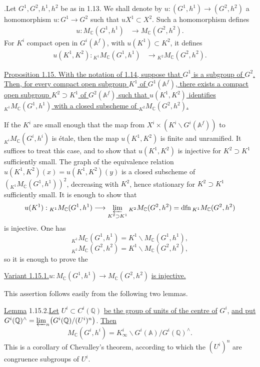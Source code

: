 \documentclass[10pt]{article}
\newcommand{\A}{\mathbb A}
\newcommand{\Af}{\mathbb A^f}
\newcommand{\C}{\mathbb C}
\newcommand{\Q}{\mathbb Q}
\newcommand{\dfn}{\operatorname{dfn}}
\newcommand{\limproj}{\varprojlim}
\newcommand{\MC}{M_{\C}}
\begin{document}
.\quad Let $G^1,G^2,h^1,h^2$ be as in 1.13. We shall denote by $u:(G^1,h^1)\to(G^2,h^2)$ a homomorphism $u:G^1\to G^2$ such that $uX^1\subset X^2$. Such a homomorphism defines
\begingroup
\makeatletter
\tagsleft@true
\makeatother
\begin{align}
u:\MC(G^1,h^1)&\longrightarrow\MC(G^2,h^2). \tag{1.14.1}
\end{align}
\endgroup
For $K^i$ compact open in $G^i(\Af)$, with $u(K^1)\subset K^2$, it defines
\begingroup
\makeatletter
\tagsleft@true
\makeatother
\begin{align}
u(K^1,K^2):{}_{K^1}\MC(G^1,h^1)&\longrightarrow{}_{K^2}\MC(G^2,h^2). \tag{1.14.2}
\end{align}
\endgroup

\noindent\uline{Proposition 1.15. With the notation of 1.14, suppose that $G^1$ is a subgroup of $G^2$. Then, for every compact open subgroup $K^1$ of $G^1(\Af)$, there exists a compact open subgroup $K^2\supset K^1$ of $G^2(\Af)$ such that $u(K^1,K^2)$ identifies ${}_{K^1}\MC(G^1,h^1)$ with a closed subscheme of ${}_{K^2}\MC(G^2,h^2)$.}

If the $K^i$ are small enough that the map from $X^i\times(K^i\backslash G^i(\Af))$ to ${}_{K^i}\MC(G^i,h^i)$ is étale, then the map $u(K^1,K^2)$ is finite and unramified. It suffices to treat this case, and to show that $u(K^1,K^2)$ is injective for $K^2\supset K^1$ sufficiently small. The graph of the equivalence relation $u(K^1,K^2)(x)=u(K^1,K^2)(y)$ is a closed subscheme of $({}_{K^1}\MC(G^1,h^1))^2$, decreasing with $K^2$, hence stationary for $K^2\supset K^1$ sufficiently small. It is enough to show that
\[
u(K^1):{}_{K^1}\MC(G^1,h^1)\longrightarrow\limproj_{K^2\supset K^1}{}_{K^2}\MC(G^2,h^2)=\dfn{}_{K^1}\MC(G^2,h^2)
\]
is injective. One has
\[
{}_{K^1}\MC(G^1,h^1)=K^1\backslash \MC(G^1,h^1),
\]
\[
{}_{K^1}\MC(G^2,h^2)=K^1\backslash \MC(G^2,h^2),
\]
so it is enough to prove the

\noindent\uline{Variant 1.15.1.}\quad $u:\MC(G^1,h^1)\longrightarrow\MC(G^2,h^2)$ \uline{is injective.}



This assertion follows easily from the following two lemmas.

\noindent\uline{Lemma} 1.15.2.\quad \uline{Let} $U^i\subset C^i(\Q)$ \uline{be the group of units of the centre of} $G^i$, \uline{and put} $G^i(\Q)^\wedge=\limproj_n\bigl(G^i(\Q)/(U^i)^n\bigr)$. \uline{Then}
\[
\MC(G^i,h^i)=K^i_\infty\backslash G^i(\A)/G^i(\Q)^\wedge .
\]
This is a corollary of Chevalley's theorem, according to which the $(U^i)^n$ are congruence subgroups of $U^i$.
\end{document}
